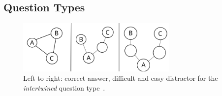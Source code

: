 \documentclass{IOS-Book-Article}     %
\newcommand{\citep}{\cite}%
\begin{document}
\subsection{Question Types}

\begin{figure}
\includegraphics[width=0.7\textwidth]{img/intertwined_cml.png} 
\caption{Left to right: correct answer, difficult and easy distractor for the \emph{intertwined} question type~\citep{snikquizba}.}
\label{fig:intertwined}
\end{figure}
\end{document}
